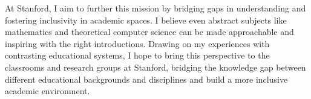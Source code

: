\documentclass[12pt]{article}
\begin{document}
At Stanford, I aim to further this mission by bridging gaps in understanding and fostering
inclusivity in academic spaces. I believe even abstract subjects like mathematics and theoretical
computer science can be made approachable and inspiring with the right introductions. Drawing on my
experiences with contrasting educational systems, I hope to bring this perspective to the classrooms
and research groups at Stanford, bridging the knowledge gap between different educational
backgrounds and disciplines and build a more inclusive academic environment. 

\newpage
\end{document}
